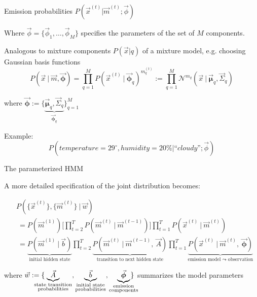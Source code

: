 \begin{frame}{\subsubsecname}

Emission probabilities $P(\vec x^{(t)} | \vec m^{(t)} ; \vec \phi)$

Where $\vec \phi = \{\vec \phi_1, \ldots, \vec \phi_M\}$ specifies the parameters of the set of $M$ components.

Analogous to mixture components $P(\vec x| q)$ of a mixture model, e.g. choosing Gaussian basis functions
\begin{equation}
P(\vec{x} ~|~ \vec{m}, \vec{\boldsymbol{\phi}}) = \prod_{q=1}^M
	P(\vec{x}^{(t)} ~|~ \vec{\boldsymbol{\phi}}_q)^{m_q^{(t)}} := \prod_{q=1}^M \mathcal{N}^{m_q} (\vec{x} ~|~ \vec{\boldsymbol{\mu}}_q, \vec{\Sigma}_q)
\end{equation}
				
where $\vec{\boldsymbol{\phi}} := \big\{\underbrace{\vec{\boldsymbol{\mu}}_q, \vec{\Sigma}_q}_{\vec{\boldsymbol{\phi}}_q} \big\}_{q=1}^M$

Example:\\
\begin{equation}
P(\mathit{temperature}=29^{\circ}, \mathit{humidity}=20\% | \text{``}\mathit{cloudy}\text{''}; \vec \phi)
\end{equation}

\end{frame}

\begin{frame}{The parameterized HMM}
	
A more detailed specification of the joint distribution becomes:
	
	\begin{align}
	&P(\{\vec{x}^{(t)}\}  , \{\vec{m}^{(t)}\} ~|~ \vec{w})
	 \\&
	~=P(\vec{m}^{(1)})
	\Bigg\lbrack
	\prod_{t=2}^T
	P(\vec{m}^{(t)} ~|~ \vec{m}^{(t-1)})
	\Bigg\rbrack
	\prod_{t=1}^T P(\vec{x}^{(t)} ~|~ \vec{m}^{(t)})
	\\&~=
	\underbrace{P(\vec{m}^{(1)}~|~ \vec{b})}_{\text{initial hidden state}}
	\prod_{t=2}^{T} 
		\underbrace{P(\vec{m}^{(t)}~|~  \vec{m}^{(t - 1)},~ \vec{A})
		}_{\text{transition to next hidden state}}
	\prod_{t=1}^{T} 
	\underbrace{P(\vec{x}^{(t)}~|~  \vec{m}^{(t)},~ \vec{\boldsymbol{\phi}})
	}_{\text{emission model $\leadsto$ observation}}
	\end{align}
	
	where $\vec{w} := \{ 
	\kern-3.5ex
		\underbrace{\vec{A}}_{\substack{\text{state transition} \\ \text{probabilities}}}, \underbrace{\vec{b}}_{\substack{\text{initial state} \\ \text{probabilities}}}, \underbrace{\vec{\boldsymbol{\phi}}}_{\substack{\text{emission} \\ \text{components}}} 
	\kern-2.5ex
		\}$ summarizes the model parameters
	
\end{frame}
